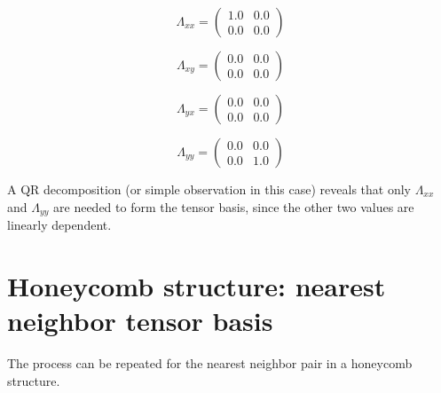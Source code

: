 \documentclass[12pt, fleqn]{article}
\begin{document}
\begin{equation}
    \Lambda_{xx}=
        \begin{pmatrix}
        1.0&0.0\\
        0.0&0.0
    \end{pmatrix}
    \label{symbasis}
\end{equation}

\begin{equation}
    \Lambda_{xy}=
        \begin{pmatrix}
        0.0&0.0\\
        0.0&0.0
    \end{pmatrix}
    \label{symbasis}
\end{equation}

\begin{equation}
    \Lambda_{yx}=
        \begin{pmatrix}
        0.0&0.0\\
        0.0&0.0
    \end{pmatrix}
    \label{symbasis}
\end{equation}

\begin{equation}
    \Lambda_{yy}=
        \begin{pmatrix}
        0.0&0.0\\
        0.0&1.0
    \end{pmatrix}
    \label{symbasis}
\end{equation}

A QR decomposition (or simple observation in this case) reveals that only $\Lambda_{xx}$ and $\Lambda_{yy}$ are
needed to form the tensor basis, since the other two values are linearly dependent.

\section{Honeycomb structure: nearest neighbor tensor basis}
The process can be repeated for the nearest neighbor pair in a honeycomb structure.
\end{document}
